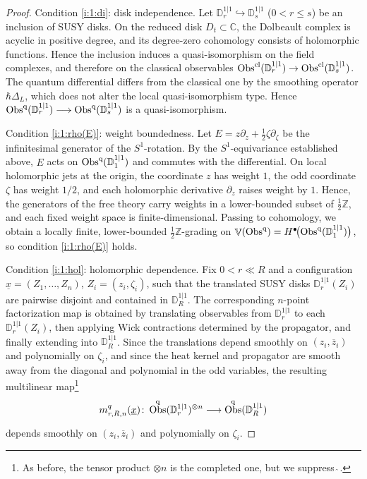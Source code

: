 \documentclass[final,reqno]{amsart}
\numberwithin{equation}{section}
\theoremstyle{definition}
\newcommand{\ol}{\overline}
\newcommand{\ul}{\underline}
\newcommand{\wh}{\widehat}
\newcommand{\inj}{\hookrightarrow}
\newcommand{\lto}{\longrightarrow}
\newcommand{\bbC}{\mathbb{C}}
\newcommand{\bbZ}{\mathbb{Z}}
\newcommand{\sD}{\mathbb{D}^{1|1}}
\newcommand{\pd}{\partial}
\newcommand{\hf}{\frac{1}{2}}
\newcommand{\cObs}[1]{\mathop{\Obs^{\textup{cl}}_{#1}}}
\newcommand{\qObs}[1]{\mathop{\Obs^{\textup{q}}_{#1}}}
\DeclareMathOperator{\bbV}{\mathbb{V}}
\DeclareMathOperator{\Obs}{Obs}
\begin{document}
\begin{proof}
\smallskip

Condition \ref{i:1:di}: disk independence.
Let $\sD_r \inj \sD_s$ ($0 < r \le s$) be an inclusion of SUSY disks. 
On the reduced disk $D_t \subset \bbC$, 
the Dolbeault complex is acyclic in positive degree, 
and its degree-zero cohomology consists of holomorphic functions. 
Hence the inclusion induces a quasi-isomorphism on the field complexes, 
and therefore on the classical observables $\cObs{}(\sD_r)\to \cObs{}(\sD_s)$. 
The quantum differential differs from the classical one 
by the smoothing operator $\hbar\Delta_L$, 
which does not alter the local quasi-isomorphism type. 
Hence $\qObs{}(\sD_r) \lto \qObs{}(\sD_s)$ is a quasi-isomorphism. 

\smallskip

Condition \ref{i:1:rho(E)}: weight boundedness.
Let $E=z\pd_z+\hf\zeta\pd_\zeta$ be the infinitesimal generator 
of the $S^1$-rotation. 
By the $S^1$-equivariance established above, 
$E$ acts on $\qObs{}(\sD_1)$ and commutes with the differential. 
On local holomorphic jets at the origin, the coordinate $z$ has weight $1$, 
the odd coordinate $\zeta$ has weight $1/2$, 
and each holomorphic derivative $\pd_z$ raises weight by $1$. 
Hence, the generators of the free theory carry weights 
in a lower-bounded subset of $\hf\bbZ$, 
and each fixed weight space is finite-dimensional. 
Passing to cohomology, we obtain a locally finite, 
lower-bounded $\hf\bbZ$-grading on
$\bbV(\qObs{}) = H^\bullet\!\bigl(\qObs{}(\sD_1)\bigr)$,
so condition \ref{i:1:rho(E)} holds.

\smallskip

Condition \ref{i:1:hol}: holomorphic dependence.
Fix $0<r\ll R$ and a configuration $\ul{x}=(Z_1,\dotsc,Z_n)$, 
$Z_i=(z_i,\zeta_i)$, such that the translated SUSY disks $\sD_r(Z_i)$ are 
pairwise disjoint and contained in $\sD_R$. 
The corresponding $n$-point factorization map is obtained by 
translating observables from $\sD_r$ to each $\sD_r(Z_i)$, 
then applying Wick contractions determined by the propagator, 
and finally extending into $\sD_R$. 
Since the translations depend smoothly on $(z_i,\ol{z}_i)$ 
and polynomially on $\zeta_i$, 
and since the heat kernel and propagator are smooth away from the diagonal
and polynomial in the odd variables, 
the resulting multilinear map\footnote{As before, 
 the tensor product $\otimes n$ is the completed one, but we suppress $\wh{\ }$.}
\[
 m^q_{r,R,n}(\ul{x})\colon \qObs{}(\sD_r)^{\otimes n} \lto \qObs{}(\sD_R)
\]
depends smoothly on $(z_i,\ol{z}_i)$ and polynomially on $\zeta_i$.


\end{proof}
\end{document}
